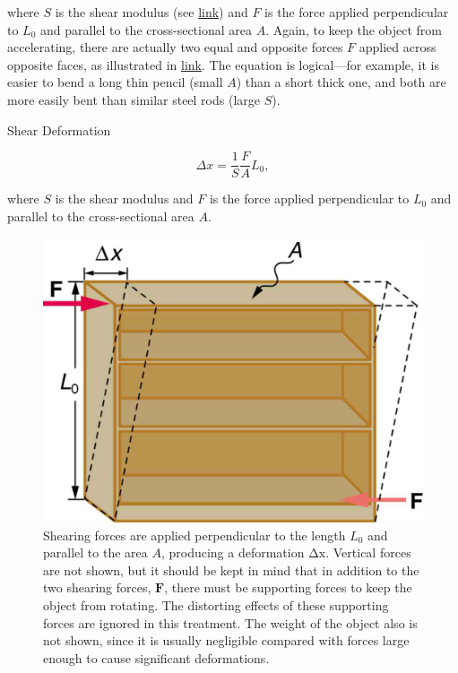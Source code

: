 \documentclass[
]{book}
\begin{document}
where \(S{}\) is the shear modulus (see
\protect\hyperlink{import-auto-id1165298671576}{link}) and \(F{}\)
is the force applied perpendicular to \(L_{0}{}\) and parallel to the
cross-sectional area \(A{}\). Again, to keep the object from accelerating,
there are actually two equal and opposite forces \(F{}\) applied across
opposite faces, as illustrated in
\protect\hyperlink{import-auto-id1165296375245}{link}. The
equation is logical---for example, it is easier to bend a long thin
pencil (small \(A{}\)) than a short thick one, and both are more easily
bent than similar steel rods (large \(S{}\)).

\hypertarget{fs-id1165298835468}{}
Shear Deformation

\leavevmode{}%
\[{{{\Delta x = \frac{1}{S}}\frac{F}{A}L_{0}},}{}\]

where \(S{}\) is the shear modulus and \(F{}\) is the force applied
perpendicular to \(L_{0}{}\) and parallel to the cross-sectional area
\(A{}\).

\begin{figure}
\hypertarget{import-auto-id1165296375245}{%
\centering
\includegraphics{images/Figure_06_03_06a.jpg}
\caption{Shearing forces are applied perpendicular to the length \(L_{\text{0}}\)
and parallel to the area \(A\), producing a deformation \(\text{Δx}\).
Vertical forces are not shown, but it should be kept in mind that in
addition to the two shearing forces, \(\textbf{F}{}\), there must be
supporting forces to keep the object from rotating. The distorting
effects of these supporting forces are ignored in this treatment. The
weight of the object also is not shown, since it is usually negligible
compared with forces large enough to cause significant
deformations.}\label{import-auto-id1165296375245}
}
\end{figure}
\end{document}
